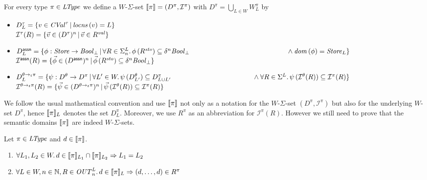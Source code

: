 \documentclass[12pt,a4paper]{report}
\newcommand{\CVal}{\nstyle{CVal}}
\newcommand{\sto}{\nstyle{sto}}
\newcommand{\val}{\nstyle{val}}
\newcommand{\OUT}{\nstyle{OUT}}
\newcommand{\I}{\mathcal{I}}
\begin{document}
\begin{definition}
  For every type $\pi\in\mathit{LType}$ we define a $W$-$\Sigma$-set $\semantic{\pi}=(D^\pi,\I^\pi)$
  with $D^\pi = \bigcup_{L\in W} W^\pi_L$ by
  \begin{itemize}
    \item $D^\tau_L = \{v\in\CVal^\tau\,|\,\locns{v} = L\}$ \\
          $\I^\tau(R) = \{\vec{v}\in(D^\tau)^n\,|\,\vec{v}\in R^\val\}$

    \item $D^\tassn_L = \{ \phi:\Store\to\Bool_\bot\,|\,
                              \forall R\in\Sigma^L_n.\,\phi\,(R^\sto) \subseteq \delta^n\Bool_\bot \\
                              \hspace*{5cm} \wedge \dom{\phi} = \Store_L
                         \}$ \\
          $\I^\tassn(R) = \{ \vec{\phi} \in (D^\tassn)^n\,|\,
                                  \vec{\phi}\,(R^\sto) \subseteq \delta^n \Bool_\bot \}$

    \item $D^{\ttarrow{\theta}{\pi}}_L = \{ \psi:D^\theta \to D^\pi\,|\,
                              \forall L'\in W.\, \psi\,(D^\theta_{L'}) \subseteq D^\pi_{L \cup L'} \\
                              \hspace*{4.2cm} \wedge \forall R\in\Sigma^L.\, \psi\,(\I^\theta(R))\subseteq\I^\pi(R)\}$ \\
          $\I^{\ttarrow{\theta}{\pi}}(R) = \{ \vec{\psi} \in (D^{\ttarrow{\theta}{\pi}})^n\,|\,
                                          \vec{\psi}\,(\I^\theta(R)) \subseteq \I^\pi(R) \}$
  \end{itemize}
\end{definition}

We follow the usual mathematical convention and use $\llbracket\pi\rrbracket$ not only as a notation
for the $W$-$\Sigma$-set $(D^\pi,\I^\pi)$ but also for the underlying $W$-set $D^\pi$,
hence $\llbracket\pi\rrbracket_L$ denotes the set $D^\pi_L$. Moreover, we use $R^\pi$ as an abbreviation
for $\I^\pi(R)$. However we still need to prove that the semantic domains $\llbracket\pi\rrbracket$
are indeed $W$-$\Sigma$-sets.

\begin{lemma}
  Let $\pi\in\mathit{LType}$ and $d \in \llbracket\pi\rrbracket$.
  \begin{enumerate}
    \item $\forall L_1,L_2\in W.\, d \in \llbracket\pi\rrbracket_{L_1} \cap \llbracket\pi\rrbracket_{L_2} \Rightarrow L_1 = L_2$
    \item $\forall L \in W, n \in \N, R\in \OUT^L_n.\, d \in \semantic{\pi}_L \Rightarrow (d,\ldots,d) \in R^\pi$
  \end{enumerate}
\end{lemma}
\end{document}

